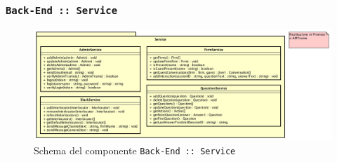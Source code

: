 \documentclass[../DefinizioneDiProdotto.tex]{subfiles}
\begin{document}
	\newpage
	\subsubsection{ \texttt{Back-End :: Service}}
	\begin{figure}[!h]
		\centering
		\includegraphics[width=\textwidth]{Architettura/Back-End/Service.png}
		\caption{Schema del componente \texttt{Back-End :: Service}}
	\end{figure}
\end{document}
